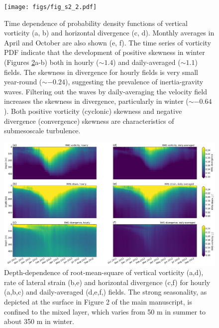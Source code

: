 \documentclass[draft,grl]{agutexSI}
\begin{document}
 \begin{figure}
    \begin{center}
      \texttt{[image: figs/fig\_s2\_2.pdf]}
   \caption{Time dependence of probability density functions of vertical vorticity (a, b)
   and horizontal divergence (c, d). Monthly averages in April and October are
   also shown (e, f). The time series of vorticity PDF indicate that
   the development of positive skewness in winter (Figures \ref{figS2_2}a-b) both in
   hourly ($\sim 1.4$) and daily-averaged ($\sim1.1$) fields. The skewness
   in divergence for hourly fields is very small year-round ($\sim -0.24$), suggesting the
   prevalence of inertia-gravity waves. Filtering out the waves by daily-averaging
   the velocity field increases the skewness in divergence, particularly in winter ($\sim-0.64$). Both
  positive vorticity (cyclonic) skewness and negative divergence (convergence) skewness
  are characteristics of submesoscale turbulence.}
   \label{figS2_2}
   \end{center}
 \end{figure}

 \begin{figure}
    \begin{center}
      \includegraphics[width=40pc]{figs/fig_s2_2.png}
   \caption{Depth-dependence of root-mean-square of vertical vorticity (a,d), rate of lateral strain (b,e)
   and horizontal divergence (c,f) for hourly (a,b,c) and daily-averaged (d,e,f,) fields.
   The strong seasonality, as depicted
   at the surface in Figure 2 of the main manuscript, is confined to the mixed layer, which
   varies from 50 m in summer to about 350 m in winter.}
   \label{figS2_2}
   \end{center}
 \end{figure}
\end{document}
